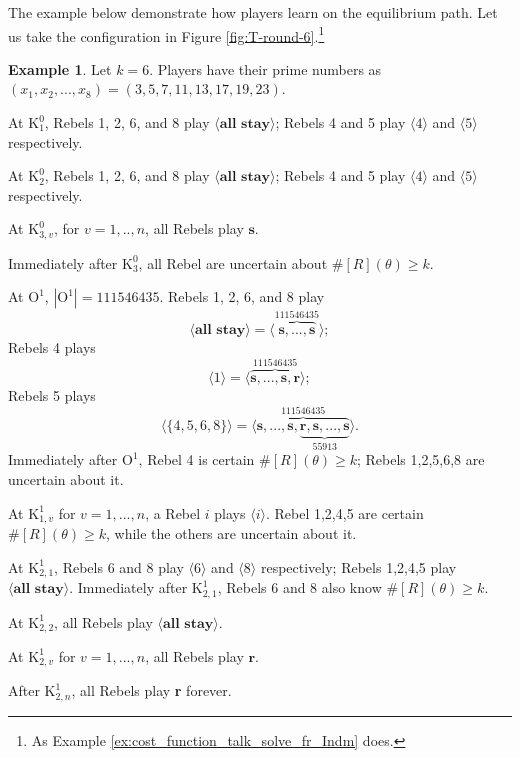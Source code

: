 \documentclass[12pt,letter]{article}
\newcommand{\Kappa}{\mathrm{K}}
\newcommand{\Omicron}{\mathrm{O}}
\theoremstyle{definition}
\newtheorem{example}{Example}
\theoremstyle{remark}
\theoremstyle{claim}
\begin{document}
The example below demonstrate how players learn on the equilibrium path. Let us take the configuration in Figure \ref{fig:T-round-6}.\footnote{As Example \ref{ex:cost_function_talk_solve_fr_Indm} does.}
\begin{example}
Let $k=6$. Players have their prime numbers as $(x_1,x_2,...,x_8)=(3,5,7,11,13,17,19,23)$.

At $\Kappa^0_{1}$, Rebels 1, 2, 6, and 8 play $\langle \textbf{all stay} \rangle$; Rebels 4 and 5 play $\langle 4 \rangle$ and $\langle 5 \rangle$ respectively. 

At $\Kappa^0_{2}$, Rebels 1, 2, 6, and 8 play $\langle \textbf{all stay} \rangle$; Rebels 4 and 5 play $\langle 4 \rangle$ and $\langle 5 \rangle$ respectively.

At $\Kappa^0_{3,v}$, for $v=1,..,n$, all Rebels play $\textbf{s} $. 

Immediately after $\Kappa^0_{3}$, all Rebel are uncertain about $\# [R](\theta)\geq k$.

At $\Omicron^1$, $|\Omicron^1|=111546435$. Rebels 1, 2, 6, and 8 play 
\[\langle \textbf{all stay} \rangle=\langle \overbrace{\textbf{s},...,\textbf{s}}^{111546435} \rangle;\] Rebels 4 plays 
\[\langle 1 \rangle=\langle \overbrace{\textbf{s},...,\textbf{s},\textbf{r}}^{111546435} \rangle;\] Rebels 5 plays 
\[\langle \{4,5,6,8\} \rangle=\langle \overbrace{\textbf{s},...,\textbf{s},\underbrace{\textbf{r},\textbf{s},...,\textbf{s}}_{55913}}^{111546435} \rangle.\] Immediately after $\Omicron^1$, Rebel 4 is certain $\# [R](\theta)\geq k$; Rebels 1,2,5,6,8 are uncertain about it.

At $\Kappa^1_{1,v}$ for $v=1,...,n$, a Rebel $i$ plays $\langle i \rangle$. Rebel 1,2,4,5 are certain $\# [R](\theta)\geq k$, while the others are uncertain about it.

At $\Kappa^1_{2,1}$, Rebels 6 and 8 play $\langle 6 \rangle$ and $\langle 8 \rangle$ respectively; Rebels 1,2,4,5 play $\langle \textbf{all stay} \rangle$. Immediately after $\Kappa^1_{2,1}$, Rebels 6 and 8 also know $\# [R](\theta)\geq k$.

At $\Kappa^1_{2,2}$, all Rebels play $\langle \textbf{all stay} \rangle$.

At $\Kappa^1_{2,v}$ for $v=1,...,n$, all Rebels play $\textbf{r} $. 

After $\Kappa^1_{2,n}$, all Rebels play \textbf{r} forever. 



\end{example}
\end{document}
